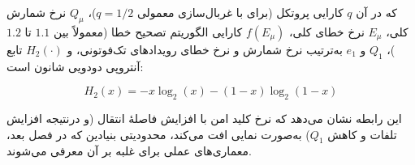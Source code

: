 که در آن $q$ کارایی پروتکل (برای  با غربال‌سازی معمولی $q=1/2$)، $Q_{\mu}$ نرخ شمارش کلی، $E_{\mu}$ نرخ خطای کلی، $f(E_{\mu})$ کارایی الگوریتم تصحیح خطا (معمولاً بین $1.1$ تا $1.2$)، $Q_1$ و $e_1$ به‌ترتیب نرخ شمارش و نرخ خطای رویدادهای تک‌فوتونی، و $H_2(\cdot)$ تابع آنتروپی دودویی شانون است:

\begin{equation}
H_2(x) = -x\log_2(x) - (1-x)\log_2(1-x)
\end{equation}

این رابطه نشان می‌دهد که نرخ کلید امن با افزایش فاصلهٔ انتقال (و درنتیجه افزایش تلفات و کاهش $Q_1$) به‌صورت نمایی افت می‌کند، محدودیتی بنیادین که در فصل بعد، معماری‌های عملی برای غلبه بر آن معرفی می‌شوند.

